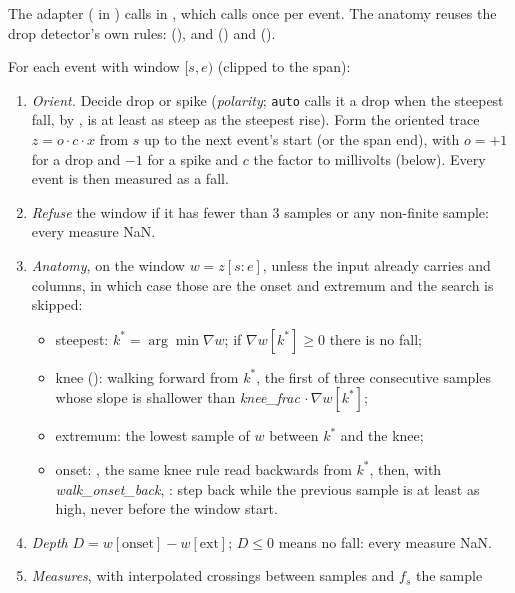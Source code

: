 The adapter ( in ) calls
 in , which calls
 once per event. The anatomy reuses the drop detector's own rules:
 (),  and
 () and 
().

For each event with window $[s, e)$ (clipped to the span):
\begin{enumerate}
\item \emph{Orient.} Decide drop or spike (\emph{polarity}; \texttt{auto} calls it a drop when
  the steepest fall, by , is at least as steep as the steepest rise). Form
  the oriented trace $z = o \cdot c \cdot x$ from $s$ up to the next event's start (or the
  span end), with $o = +1$ for a drop and $-1$ for a spike and $c$ the factor to millivolts
  (below). Every event is then measured as a fall.
\item \emph{Refuse} the window if it has fewer than 3 samples or any non-finite sample:
  every measure NaN.
\item \emph{Anatomy}, on the window $w = z[s{:}e]$, unless the input already carries
   and  columns, in which case those are the onset and
  extremum and the search is skipped:
  \begin{itemize}
  \item steepest: $k^* = \arg\min \nabla w$; if $\nabla w[k^*] \ge 0$ there is no fall;
  \item knee (): walking forward from $k^*$, the first of three
    consecutive samples whose slope is shallower than \emph{knee\_frac}$\,\cdot \nabla w[k^*]$;
  \item extremum: the lowest sample of $w$ between $k^*$ and the knee;
  \item onset: , the same knee rule read backwards from $k^*$, then, with
    \emph{walk\_onset\_back}, : step back while the previous
    sample is at least as high, never before the window start.
  \end{itemize}
\item \emph{Depth} $D = w[\text{onset}] - w[\text{ext}]$; $D \le 0$ means no fall: every
  measure NaN.
\item \emph{Measures}, with interpolated crossings between samples and $f_s$ the sample

\end{enumerate}
